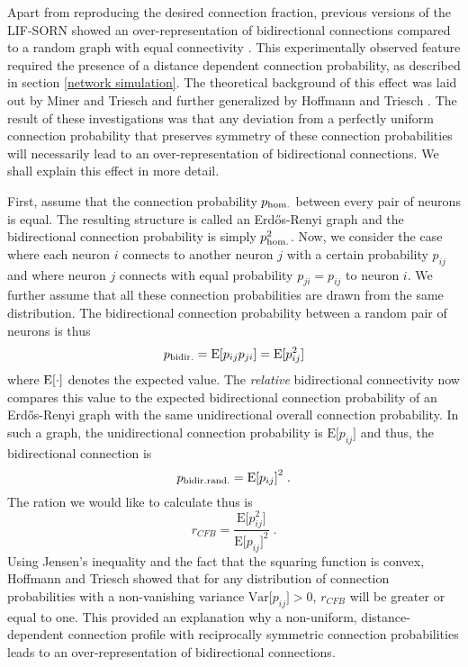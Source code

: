 \documentclass[10pt,a4paper]{article}
\begin{document}
Apart from reproducing the desired connection fraction, previous versions of the LIF-SORN showed an over-representation of bidirectional connections compared to a random graph with equal connectivity \cite{SORN_Paper}. This experimentally observed feature required the presence of a distance dependent connection probability, as described in section \ref{network simulation}. The theoretical background of this effect was laid out by Miner and Triesch \cite{SORN_Paper} and further generalized by Hoffmann and Triesch \cite{Hoffmann_2017}. The result of these investigations was that any deviation from a perfectly uniform connection probability that preserves symmetry of these connection probabilities will necessarily lead to an over-representation of bidirectional connections. We shall explain this effect in more detail.

First, assume that the connection probability $p_{\rm hom.}$ between every pair of neurons is equal. The resulting structure is called an Erd\H{o}s-Renyi graph and the bidirectional connection probability is simply $p_{\rm hom.}^2$. Now, we consider the case where each neuron $i$ connects to another neuron $j$ with a certain probability $p_{ij}$ and where neuron $j$ connects with equal probability $p_{ji}=p_{ij}$ to neuron $i$. We further assume that all these connection probabilities are drawn from the same distribution. The bidirectional connection probability between a random pair of neurons is thus
\begin{equation}
p_{\rm bidir.} = \mathrm{E[}p_{ij}p_{ji}\mathrm{]} = \mathrm{E[}p_{ij}^2\mathrm{]}
\label{bidir_prob}
\end{equation}
where $\rm E[\cdot ]$ denotes the expected value. The \textit{relative} bidirectional connectivity now compares this value to the expected bidirectional connection probability of an Erd\H{o}s-Renyi graph with the same unidirectional overall connection probability. In such a graph, the unidirectional connection probability is $\mathrm{E[}p_{ij}\mathrm{]}$ and thus, the bidirectional connection is
\begin{equation}
p_{\rm bidir. rand.} = \mathrm{E[}p_{ij}\mathrm{]}^2 \; .
\label{bidir_rand_prob}
\end{equation}
The ration we would like to calculate thus is
\begin{equation}
r_{CFB} = \frac{\mathrm{E[}p_{ij}^2\mathrm{]}}{\mathrm{E[}p_{ij}\mathrm{]}^2} \; .
\end{equation}
Using Jensen's inequality and the fact that the squaring function is convex, Hoffmann and Triesch showed that for any distribution of connection probabilities with a non-vanishing variance $\mathrm{Var[}p_{ij}\mathrm{]} > 0$, $r_{CFB}$ will be greater or equal to one. This provided an explanation why a non-uniform, distance-dependent connection profile with reciprocally symmetric connection probabilities leads to an over-representation of bidirectional connections.
\end{document}
